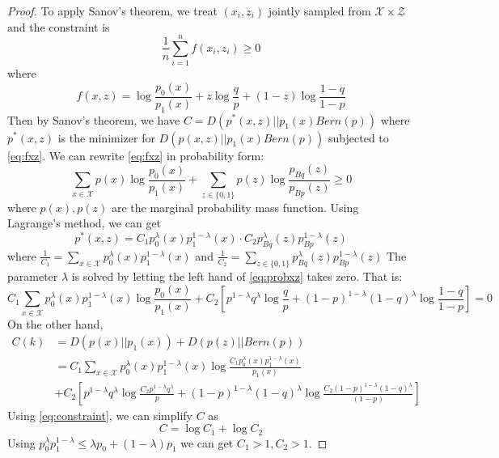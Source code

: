 \documentclass{article}
\begin{document}
\begin{proof}
	To apply Sanov's theorem, we treat $(x_i, z_i)$ jointly sampled from $\mathcal{X} \times \mathcal{Z}$
	and the constraint is 
	\begin{equation}\label{eq:fxz}	
	\frac{1}{n} \sum_{i=1}^n f(x_i, z_i) \geq 0
	\end{equation}	
	where
	$$
	f(x, z) = \log\frac{p_0(x)}{p_1(x)} + z \log\frac{q}{p} + (1-z) \log \frac{1-q}{1-p}
	$$
	Then by Sanov's theorem, we have $C = D(p^*(x,z)|| p_1(x)Bern(p))$
	where $p^*(x,z)$ is the minimizer for $D(p(x,z)|| p_1(x)Bern(p))$ subjected to
	\eqref{eq:fxz}.
	We can rewrite \eqref{eq:fxz} in probability form:
	\begin{equation}\label{eq:probxz}
	\sum_{x\in \mathcal{X}} p(x) \log\frac{p_0(x)}{p_1(x)} + \sum_{z \in \{0,1\}} p(z) \log\frac{p_{Bq}(z)}{p_{Bp}(z)} \geq 0
	\end{equation}
	where $p(x), p(z)$ are the marginal probability mass function.
	Using Lagrange's method, we can get
	\begin{equation}
	p^*(x,z) = C_1 p_0^{\lambda}(x)p_1^{1-\lambda}(x) \cdot C_2 p_{Bq}^{\lambda}(z)p_{Bp}^{1-\lambda}(z)
	\end{equation}
	where $\frac{1}{C_1} = \sum_{x\in\mathcal{X}}p_0^{\lambda}(x)p_1^{1-\lambda}(x) $
	and $\frac{1}{C_2} = \sum_{z\in \{0,1\}} p_{Bq}^{\lambda}(z)p_{Bp}^{1-\lambda}(z)$
	The parameter $\lambda$ is solved by letting the left hand of \eqref{eq:probxz} takes zero.
	That is:
	\begin{equation}\label{eq:constraint}
	C_1 \sum_{x\in \mathcal{X}} p_0^{\lambda}(x)p_1^{1-\lambda}(x)\log\frac{p_0(x)}{p_1(x)} + C_2[p^{1-\lambda}q^{\lambda}\log\frac{q}{p} +
	(1-p)^{1-\lambda}(1-q)^{\lambda}\log\frac{1-q}{1-p} ] = 0
	\end{equation}
	On the other hand,
	\begin{align*}
	C(k) & = D(p(x)|| p_1(x)) + D(p(z) || Bern(p)) \\
	& = C_1\sum_{x\in \mathcal{X}} p_0^{\lambda}(x)p_1^{1-\lambda}(x)\log\frac{C_1  p_0^{\lambda}(x)p_1^{1-\lambda}(x)}{p_1(x)}  \\
	& + C_2[p^{1-\lambda}q^{\lambda}\log\frac{C_2 p^{1-\lambda}q^{\lambda}}{p} +
	(1-p)^{1-\lambda}(1-q)^{\lambda}\log\frac{C_2(1-p)^{1-\lambda}(1-q)^{\lambda}}{(1-p)} ] 
	\end{align*}
	Using \eqref{eq:constraint}, we can simplify $C$ as
	\begin{equation}
	C  =  \log  C_1 + \log C_2
	\end{equation}
	Using $p_0^{\lambda} p_1^{1-\lambda} \leq \lambda p_0 + (1-\lambda) p_1$ we can get $C_1 > 1, C_2 > 1$.

\end{proof}
\end{document}
